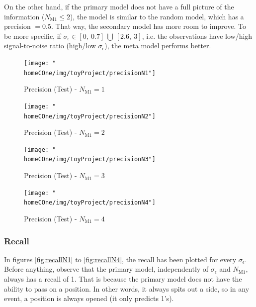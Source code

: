 \documentclass[a4paper]{article}
\newcommand{\homeCOne}{../../Chapter 1 - Metalabeling/Draft}
\begin{document}
On the other hand, if the primary model does not have a full picture 
of the information ($N_{\text{M1}} \leq 2$), the model is similar to 
the random model, which has a precision $= 0.5$. That way, the 
secondary model has more room to improve. To be more specific, if 
$\sigma_\epsilon \in [0,\ 0.7]\ \bigcup \ [2.6,\ 3]$, i.e. the 
observations have low/high signal-to-noise ratio (high/low 
$\sigma_\epsilon$), the meta model performs better.

\begin{figure}[htbp]
\centering
	\begin{minipage}{.5\textwidth}
	\centering
		\texttt{[image: "\\homeCOne/img/toyProject/precisionN1"]}
	  	\caption{Precision (Test) - $N_{\text{M1}} = 1$}
	  	\label{fig:precisionN1}
	\end{minipage}%
	\begin{minipage}{.5\textwidth}
	\centering
		\texttt{[image: "\\homeCOne/img/toyProject/precisionN2"]}
		\caption{Precision (Test) - $N_{\text{M1}} = 2$}
		\label{fig:precisionN2}
	\end{minipage}

	\vspace{.5cm}

	\begin{minipage}{.5\textwidth}
	\centering
		\texttt{[image: "\\homeCOne/img/toyProject/precisionN3"]}
		\caption{Precision (Test) - $N_{\text{M1}} = 3$}
		\label{fig:precisionN3}
	\end{minipage}%
	\begin{minipage}{.5\textwidth}
	\centering
		\texttt{[image: "\\homeCOne/img/toyProject/precisionN4"]}
		\caption{Precision (Test) - $N_{\text{M1}} = 4$}
		\label{fig:precisionN4}
	\end{minipage}
\end{figure}

\subsubsection{Recall}
\label{sec:toyProjectRecall}
In figures \ref{fig:recallN1} to \ref{fig:recallN4}, the recall has 
been plotted for every $\sigma_\epsilon$. Before anything, observe 
that the primary model, independently of $\sigma_\epsilon$ and 
$N_{\text{M1}}$, always has a recall of 1. That is because the primary 
model does not have the ability to pass on a position. In other words, 
it always spits out a side, so in any event, a position is always 
opened (it only predicts 1's).\\
\end{document}
